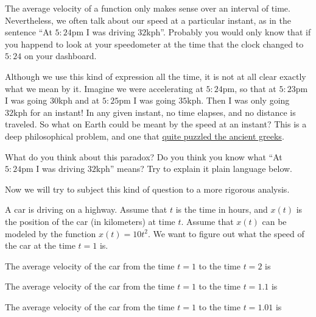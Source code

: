 \documentclass{ximera}
\begin{document}
The average velocity of a function only makes sense over an interval of time.  Nevertheless, we often talk about our speed at a particular instant, as in the sentence ``At $5:24 \textrm{pm}$ I was driving $32 \textrm{kph}$''.  Probably you would only know that if you happend to look at your speedometer at the time that the clock changed to $5:24$ on your dashboard.

Although we use this kind of expression all the time, it is not at all clear exactly what we mean by it.  Imagine we were accelerating at $5:24 \textrm{pm}$, so that at $5:23 \textrm{pm}$ I was going $30 \textrm{kph}$ and at $5:25 \textrm{pm}$ I was going $35 \textrm{kph}$.  Then I was only going $32 \textrm{kph}$ for an instant! In any given instant, no time elapses, and no distance is traveled.  So what on Earth could be meant by the speed at an instant?  This is a deep philosophical problem, and one that \href{wiki}{quite puzzled the ancient greeks}.

\begin{question}

What do you think about this paradox?  Do you think you know what ``At $5:24 \textrm{pm}$ I was driving $32 \textrm{kph}$'' means?  Try to explain it plain language below.
\begin{free-response}

\end{free-response}

\end{question}

Now we will try to subject this kind of question to a more rigorous analysis.

A car is driving on a highway.  Assume that $t$ is the time in hours, and $x(t)$ is the position of the car (in kilometers) at time $t$.  Assume that $x(t)$ can be modeled by the function $x(t) = 10t^2$.  We want to figure out what the speed of the car at the time $t=1$ is.

\begin{question}
	The average velocity of the car from the time $t=1$ to the time $t=2$ is \answer{}
\end{question}

\begin{question}
	The average velocity of the car from the time $t=1$ to the time $t=1.1$ is \answer{}
\end{question}

\begin{question}
	The average velocity of the car from the time $t=1$ to the time $t=1.01$ is \answer{}
\end{question}
\end{document}
